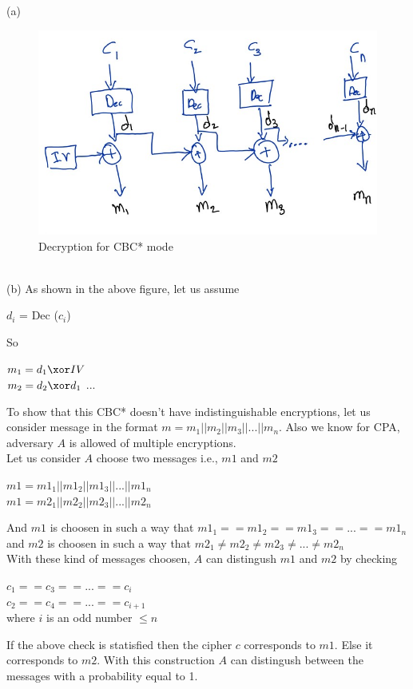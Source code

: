 (a)\\
\begin{figure}[h]
    \includegraphics[width=\textwidth,height=\textheight,keepaspectratio]{6-1 Fig1.jpg}
    \caption{Decryption for CBC* mode}
    \centering
\end{figure}\\
(b) As shown in the above figure, let us assume 

\begin{center}
    $d_i$ = Dec ($c_i$)
\end{center}

So 

\begin{center}
    $m_1 = d_1 \xor IV $\\
    $m_2 = d_2 \xor d_1 $ ...
\end{center}

To show that this CBC* doesn't have indistinguishable encryptions, 
let us consider message in the format $m = m_1|| m_2||m_3|| ... ||m_n$.
Also we know for CPA, adversary $A$ is allowed of multiple encryptions.\\

Let us consider $A$ choose two messages i.e., $m1$ and $m2$ 

\begin{center}
    $m1 = m1_1|| m1_2||m1_3|| ... ||m1_n$\\
    $m1 = m2_1|| m2_2||m2_3|| ... ||m2_n$
\end{center}

And $m1$ is choosen in such a way that $m1_1 ==  m1_2 == m1_3 == ... == m1_n$ and
$m2$ is choosen in such a way that $m2_1 \neq  m2_2 \neq m2_3 \neq ... \neq m2_n$\\

With these kind of messages choosen, $A$ can distingush $m1$ and $m2$ by checking
\begin{center}
    $c_1 == c_3 == ... == c_i$\\
    $c_2 == c_4 == ...  == c_{i+1}$\\
    where $i$ is an odd number $ \leq n$
\end{center}

If the above check is statisfied then the cipher $c$ corresponds to $m1$. Else it corresponds to $m2$.
With this construction $A$ can distingush between the messages with a probability equal to 1.
